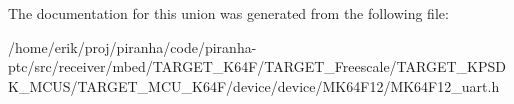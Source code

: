 The documentation for this union was generated from the following file\+:\begin{DoxyCompactItemize}
\item 
/home/erik/proj/piranha/code/piranha-\/ptc/src/receiver/mbed/\+T\+A\+R\+G\+E\+T\+\_\+\+K64\+F/\+T\+A\+R\+G\+E\+T\+\_\+\+Freescale/\+T\+A\+R\+G\+E\+T\+\_\+\+K\+P\+S\+D\+K\+\_\+\+M\+C\+U\+S/\+T\+A\+R\+G\+E\+T\+\_\+\+M\+C\+U\+\_\+\+K64\+F/device/device/\+M\+K64\+F12/M\+K64\+F12\+\_\+uart.\+h\end{DoxyCompactItemize}
